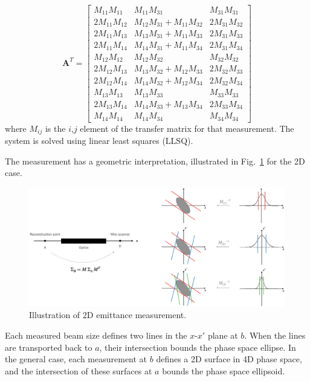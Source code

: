 %
\begin{equation}
    \mathbf{A}^T = 
    \begin{bmatrix}
        M_{11}M_{11} & M_{11}M_{31} & M_{31}M_{31} \\
        2M_{11}M_{12} & M_{12}M_{31} + M_{11}M_{32} & 2M_{31}M_{32} \\
        2M_{11}M_{13} & M_{13}M_{31} + M_{11}M_{33} & 2M_{31}M_{33} \\
        2M_{11}M_{14} & M_{14}M_{31} + M_{11}M_{34} & 2M_{31}M_{34} \\
        M_{12}M_{12} & M_{12}M_{32} & M_{32}M_{32} \\
        2M_{12}M_{13} & M_{13}M_{32} + M_{12}M_{33} & 2M_{32}M_{33} \\
        2M_{12}M_{14} & M_{14}M_{32} + M_{12}M_{34} & 2M_{32}M_{34} \\
        M_{13}M_{13} & M_{13}M_{33} & M_{33}M_{33} \\
        2M_{13}M_{14} & M_{14}M_{33} + M_{13}M_{34} & 2M_{33}M_{34} \\
        M_{14}M_{14} & M_{14}M_{34} & M_{34}M_{34}
    \end{bmatrix}
\end{equation}
%
where $M_{ij}$ is the $i$,$j$ element of the transfer matrix for that measurement. The system is solved using linear least squares (LLSQ). 

The measurement has a geometric interpretation, illustrated in  Fig.~\ref{fig:ws_emittance_measurement} for the 2D case. 
%
\begin{figure}[!p]
    \centering
    \includegraphics[width=\textwidth]{Images/chapter4/ws_emittance_measurement.png}
    \caption{Illustration of 2D emittance measurement.}
    \label{fig:ws_emittance_measurement}
\end{figure}
%
Each measured beam size defines two lines in the $x$-$x'$ plane at $b$. When the lines are transported back to $a$, their intersection bounds the phase space ellipse. In the general case, each measurement at $b$ defines a 2D surface in 4D phase space, and the intersection of these surfaces at $a$ bounds the phase space ellipsoid.


